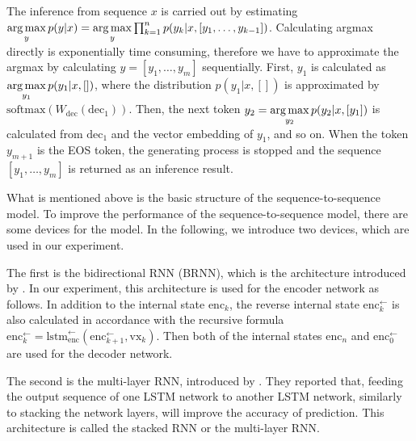 \documentclass[11pt]{jarticle}
\newcommand{\argmax}{\mathop{\rm arg\,max}\limits}
\begin{document}
The inference from sequence $x$ is carried out by estimating
$ \argmax_{y} p(y|x) = \argmax_{y} \prod_{k=1}^n p(y_k|x,[y_1,\dots,y_{k-1}]) $.
Calculating argmax directly is exponentially time consuming, therefore we have to approximate the argmax by calculating $y = [y_1, \dots, y_m]$ sequentially.
First, $y_1$ is calculated as $ \argmax_{y_1} p(y_1|x,[]) $, where the distribution $ p(y_1|x,[]) $ is approximated by 
$ \mathrm{softmax}(W_{\mathrm{dec}}(\mathrm{dec}_{1}))$. 
Then, the next token $y_2 = \argmax_{y_2} p(y_2|x,[y_1]) $ is calculated from $ \mathrm{dec}_{1} $ and the vector embedding of $y_1$, and so on.
When the token $y_{m+1}$ is the EOS token, the generating process is stopped and the sequence $ [y_1, \dots ,y_m]$ is returned as an inference result.



What is mentioned above is the basic structure of the sequence-to-sequence model.
To improve the performance of the sequence-to-sequence model, there are some devices for the model.
In the following, we introduce two devices, which are used in our experiment.

The first is the bidirectional RNN (BRNN), which is the architecture introduced by \citet{BiRNN}.
In our experiment, this architecture is used for the encoder network as follows.
In addition to the internal state $ \mathrm{enc}_{k} $, the reverse internal state $ \mathrm{enc}_{k}^{\gets} $ is also calculated 
in accordance with the recursive formula $ \mathrm{enc}_{k}^{\gets} = \mathrm{lstm}_{\mathrm{enc}}^{\gets}(\mathrm{enc}_{k+1}^{\gets},\mathrm{vx}_{k}) $.
Then both of the internal states $ \mathrm{enc}_{n} $ and $ \mathrm{enc}_{0}^{\gets} $ are used for the decoder network.

The second is the multi-layer RNN, introduced by \citet{multi_layer}.
They reported that, feeding the output sequence of one LSTM network to another LSTM network, similarly to stacking the network layers, will improve the accuracy of prediction.
This architecture is called the stacked RNN or the multi-layer RNN.



\end{document}
